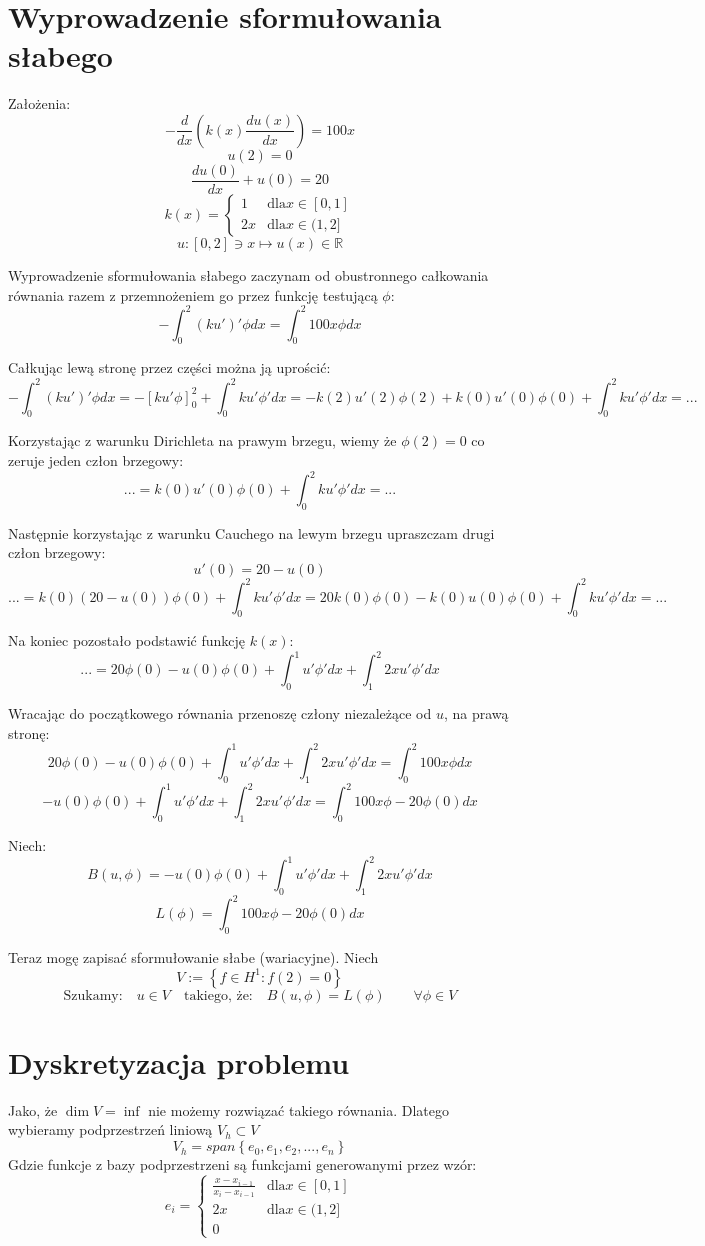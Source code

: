 \documentclass[a4paper]{article}
\begin{document}
\section{Wyprowadzenie sformułowania słabego}
Założenia:
\[-\frac{d}{dx}\left(k(x)\frac{du(x)}{dx}\right) = 100x \]
\[u(2) = 0\]
\[\frac{du(0)}{dx} + u(0) = 20\]
\[k(x) =
 \begin{cases}
    1  & \text{dla} x\in [0,1]\\
    2x & \text{dla} x\in (1,2]
  \end{cases}\]
  \[u: [0,2] \ni x \mapsto u(x) \in \mathbb{R}  \]

  Wyprowadzenie sformułowania słabego zaczynam od obustronnego całkowania równania 
  razem z przemnożeniem go przez funkcję testującą $\phi$:
  \[-\int_{0}^{2}(ku')'\phi dx = \int_{0}^{2}100x\phi dx\]

  Całkując lewą stronę przez części można ją uprościć:
  \[-\int_{0}^{2}(ku')'\phi dx = -\left[ku'\phi\right]_0^2 + \int_{0}^{2}ku'\phi' dx
  = -k(2)u'(2)\phi(2) + k(0)u'(0)\phi(0) + \int_{0}^{2}ku'\phi' dx = ...\]

  Korzystając z warunku Dirichleta na prawym brzegu, wiemy że $\phi(2) = 0$ co zeruje jeden człon brzegowy:
  \[... = k(0)u'(0)\phi(0) + \int_{0}^{2}ku'\phi' dx = ... \]

  Następnie korzystając z warunku Cauchego na lewym brzegu upraszczam drugi człon brzegowy:
  \[u'(0) = 20 - u(0)\]
  \[... = k(0)(20 - u(0))\phi(0) + \int_{0}^{2}ku'\phi' dx = 20k(0)\phi(0) - k(0)u(0)\phi(0) + \int_{0}^{2}ku'\phi' dx = ...\]

  Na koniec pozostało podstawić funkcję $k(x)$:
  \[... = 20\phi(0) - u(0)\phi(0) + \int_{0}^{1}u'\phi' dx + \int_{1}^{2}2xu'\phi' dx\]

  Wracając do początkowego równania przenoszę człony niezależące od $u$, na prawą stronę:
  \[20\phi(0) - u(0)\phi(0) + \int_{0}^{1}u'\phi' dx + \int_{1}^{2}2xu'\phi' dx = \int_{0}^{2}100x\phi dx\]
  \[-u(0)\phi(0) + \int_{0}^{1}u'\phi' dx + \int_{1}^{2}2xu'\phi' dx = \int_{0}^{2}100x\phi -20\phi(0)dx\]

  Niech:
  \[B(u, \phi) = -u(0)\phi(0) + \int_{0}^{1}u'\phi' dx + \int_{1}^{2}2xu'\phi' dx\]
  \[L(\phi) = \int_{0}^{2}100x\phi -20\phi(0)dx\]

  Teraz mogę zapisać sformułowanie słabe (wariacyjne). Niech
  \[ V := \left\{f \in H^1 : f(2) = 0\right\} \]
  \[\text{Szukamy:} \quad u \in V \quad \text{takiego, że:} \quad B(u, \phi) = L(\phi) \qquad \forall \phi \in V \]
  \pagebreak
  \section{Dyskretyzacja problemu}
  Jako, że $\dim V = \inf$ nie możemy rozwiązać takiego równania. Dlatego wybieramy podprzestrzeń liniową
  $V_h \subset V$
  \[V_h = span \left\{e_0, e_1, e_2, ... , e_n\right\}\]
  Gdzie funkcje z bazy podprzestrzeni są funkcjami generowanymi przez wzór:
  \[
    e_i = 
    \begin{cases}
        \frac{x - x_{i-1}}{x_i - x_{i-1}}  & \text{dla} x\in [0,1]\\
        2x & \text{dla} x\in (1,2] \\
        0
    \end{cases}  
  \]
  \pagebreak
\end{document}
